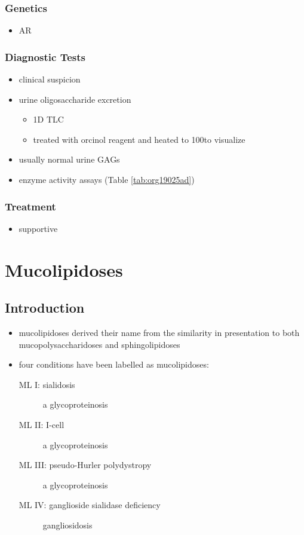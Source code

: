 \documentclass[12pt]{scrartcl}
\begin{document}
\subsubsection{Genetics}
\label{sec:orgc8a23ae}
\begin{itemize}
\item AR
\end{itemize}
\subsubsection{Diagnostic Tests}
\label{sec:orgd77047d}
\begin{itemize}
\item clinical suspicion
\item urine oligosaccharide excretion
\begin{itemize}
\item 1D TLC
\item treated with orcinol reagent and heated to 100\degreeC to visualize
\end{itemize}
\item usually normal urine GAGs
\item enzyme activity assays (Table \ref{tab:org19025ad})
\end{itemize}

\subsubsection{Treatment}
\label{sec:org2ed086f}
\begin{itemize}
\item supportive
\end{itemize}
\section{Mucolipidoses}
\label{sec:org543458f}
\subsection{Introduction}
\label{sec:org15c1f63}
\begin{itemize}
\item mucolipidoses derived their name from the similarity in
presentation to both mucopolysaccharidoses and sphingolipidoses
\item four conditions have been labelled as mucolipidoses:
\begin{description}
\item[{ML I: sialidosis}] a glycoproteinosis
\item[{ML II: I-cell}] a glycoproteinosis
\item[{ML III: pseudo-Hurler polydystropy}] a glycoproteinosis
\item[{ML IV: ganglioside sialidase deficiency}] gangliosidosis
\end{description}
\end{itemize}
\end{document}
